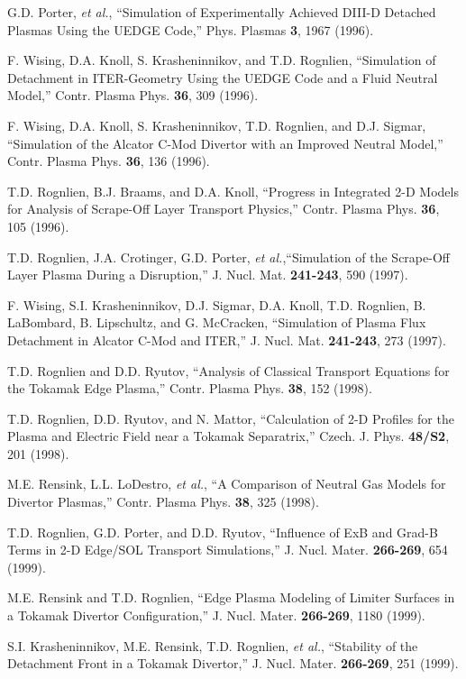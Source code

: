 \documentclass [12pt]{article}
\begin{document}
\begin{thebibliography}{99}
 G.D. Porter, {\it et al.}, ``Simulation of Experimentally
  Achieved DIII-D Detached Plasmas Using the UEDGE Code,'' Phys. Plasmas {\bf
    3}, 1967 (1996).
  
 F. Wising, D.A. Knoll, S. Krasheninnikov, and T.D. Rognlien,
  ``Simulation of Detachment in ITER-Geometry Using the UEDGE Code and a Fluid
  Neutral Model,'' Contr. Plasma Phys. {\bf  36}, 309 (1996).
  
 F. Wising, D.A. Knoll, S. Krasheninnikov, T.D. Rognlien, and
  D.J. Sigmar, ``Simulation of the Alcator C-Mod Divertor with an Improved
  Neutral Model,'' Contr. Plasma Phys. {\bf  36}, 136 (1996).
  
 T.D. Rognlien, B.J. Braams, and D.A. Knoll, ``Progress in
  Integrated 2-D Models for Analysis of Scrape-Off Layer Transport Physics,''
  Contr. Plasma Phys. {\bf  36}, 105 (1996).
  
 T.D. Rognlien, J.A. Crotinger, G.D. Porter, {\it et
    al.},``Simulation of the Scrape-Off Layer Plasma During a Disruption,'' J.
  Nucl. Mat. {\bf 241-243}, 590 (1997).

 F. Wising, S.I. Krasheninnikov, D.J. Sigmar, D.A. Knoll, T.D.
  Rognlien, B. LaBombard, B. Lipschultz, and G. McCracken, ``Simulation of
  Plasma Flux Detachment in Alcator C-Mod and ITER,'' J. Nucl. Mat. {\bf
    241-243}, 273 (1997).
  
 T.D. Rognlien and D.D. Ryutov, ``Analysis of Classical Transport
  Equations for the Tokamak Edge Plasma,'' Contr. Plasma Phys. {\bf  38}, 152
  (1998).
  
 T.D. Rognlien, D.D. Ryutov, and N. Mattor, ``Calculation of 2-D
  Profiles for the Plasma and Electric Field near a Tokamak Separatrix,''
  Czech. J. Phys. {\bf  48/S2}, 201 (1998).
  
 M.E. Rensink, L.L. LoDestro, {\it et al.}, ``A Comparison of
  Neutral Gas Models for Divertor Plasmas,'' Contr. Plasma Phys. {\bf 38}, 325
  (1998).
  
 T.D. Rognlien, G.D. Porter, and D.D. Ryutov, ``Influence of ExB
  and Grad-B Terms in 2-D Edge/SOL Transport Simulations,'' J. Nucl. Mater.
  {\bf 266-269}, 654 (1999).
  
 M.E. Rensink and T.D. Rognlien, ``Edge Plasma Modeling of
  Limiter Surfaces in a Tokamak Divertor Configuration,'' J. Nucl. Mater. {\bf
    266-269}, 1180 (1999).
  
 S.I. Krasheninnikov, M.E. Rensink, T.D. Rognlien, {\it et al.},
  ``Stability of the Detachment Front in a Tokamak Divertor,'' J. Nucl. Mater.
  {\bf 266-269}, 251 (1999).


\end{thebibliography}
\end{document}
